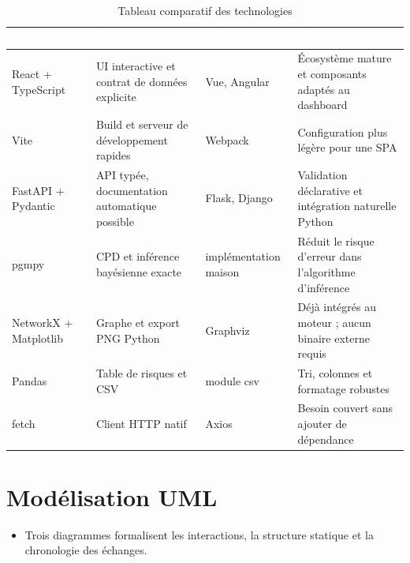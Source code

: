 \documentclass[12pt,a4paper]{article}
\newcommand{\forcereset}[1]{%
    \needspace{#1\baselineskip}%
}
\begin{document}
\begin{table}[H]
\centering
\caption{Tableau comparatif des technologies}
\label{tab:technologies}
\setlength{\tabcolsep}{10pt}
\begin{tabular}{>{\raggedright\arraybackslash}p{3.2cm} >{\raggedright\arraybackslash}p{3.5cm} >{\raggedright\arraybackslash}p{3.2cm} >{\raggedright\arraybackslash}p{3.5cm}}
\toprule
\rowcolor{primary}
\textcolor{white}{\textbf{Technologie}} & \textcolor{white}{\textbf{Pourquoi}} & \textcolor{white}{\textbf{Alternative}} & \textcolor{white}{\textbf{Motif du choix}} \\
\midrule
React + TypeScript & UI interactive et contrat de données explicite & Vue, Angular & Écosystème mature et composants adaptés au dashboard \\
Vite & Build et serveur de développement rapides & Webpack & Configuration plus légère pour une SPA \\
FastAPI + Pydantic & API typée, documentation automatique possible & Flask, Django & Validation déclarative et intégration naturelle Python \\
pgmpy & CPD et inférence bayésienne exacte & implémentation maison & Réduit le risque d'erreur dans l'algorithme d'inférence \\
NetworkX + Matplotlib & Graphe et export PNG Python & Graphviz & Déjà intégrés au moteur ; aucun binaire externe requis \\
Pandas & Table de risques et CSV & module csv & Tri, colonnes et formatage robustes \\
fetch & Client HTTP natif & Axios & Besoin couvert sans ajouter de dépendance \\
\bottomrule
\end{tabular}
\end{table}

\newpage

\section{Modélisation UML}
\forcereset{5}

\begin{itemize}[leftmargin=1.2cm, itemsep=0.2\baselineskip]
    \item Trois diagrammes formalisent les interactions, la structure statique et la chronologie des échanges.
\end{itemize}
\end{document}
